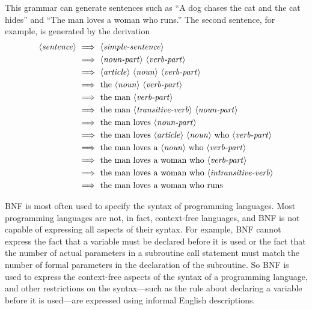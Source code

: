 \noindent This grammar can generate sentences such as ``A dog chases the cat and
the cat hides'' and ``The man loves a woman who runs.''
The second sentence, for example, is generated by the derivation
\begin{align*}
    \NT{sentence}\ &\YIELDS\ \NT{simple-sentence}\\
       &\YIELDS\ \NT{noun-part}\ \NT{verb-part}\\
       &\YIELDS\ \NT{article}\ \NT{noun}\ \NT{verb-part}\\
       &\YIELDS\ \mbox{the}\ \NT{noun}\ \NT{verb-part}\\
       &\YIELDS\ \mbox{the}\ \mbox{man}\ \NT{verb-part}\\
       &\YIELDS\ \mbox{the}\ \mbox{man}\ \NT{transitive-verb}\ \NT{noun-part}\\
       &\YIELDS\ \mbox{the}\ \mbox{man}\ \mbox{loves}\ \NT{noun-part}\\
       &\YIELDS\ \mbox{the}\ \mbox{man}\ \mbox{loves}\ \NT{article}
              \ \NT{noun}\ \mbox{who}\ \NT{verb-part}\\
       &\YIELDS\ \mbox{the}\ \mbox{man}\ \mbox{loves}\ \mbox{a}
              \ \NT{noun}\ \mbox{who}\ \NT{verb-part}\\
       &\YIELDS\ \mbox{the}\ \mbox{man}\ \mbox{loves}\ \mbox{a}
              \ \mbox{woman}\ \mbox{who}\ \NT{verb-part}\\
       &\YIELDS\ \mbox{the}\ \mbox{man}\ \mbox{loves}\ \mbox{a}
              \ \mbox{woman}\ \mbox{who}\ \NT{intransitive-verb}\\
       &\YIELDS\ \mbox{the}\ \mbox{man}\ \mbox{loves}\ \mbox{a}
              \ \mbox{woman}\ \mbox{who}\ \mbox{runs}
\end{align*}

\medskip

BNF is most often used to specify the syntax of programming languages.
Most programming languages are not, in fact, context-free languages, and
BNF is not capable of expressing all aspects of their syntax.
For example, BNF cannot express the fact that a variable must
be declared before it is used or the fact that the number of
actual parameters in a subroutine call statement must match the number
of formal parameters in the declaration of the subroutine.
So BNF is used to express the context-free aspects of the syntax
of a programming language, and other restrictions on the syntax---such
as the rule about declaring a variable before it is used---are expressed
using informal English descriptions.

